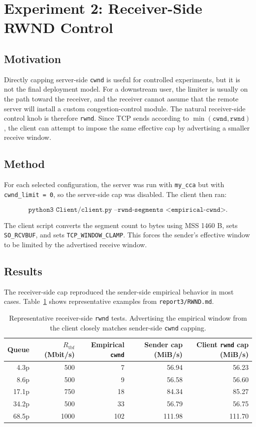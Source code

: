 \documentclass{article}
\newcommand{\code}[1]{\texttt{#1}}
\begin{document}
\section{Experiment 2: Receiver-Side RWND Control}

\subsection{Motivation}

Directly capping server-side \code{cwnd} is useful for controlled experiments, but it is not the final deployment model. 
For a downstream user, the limiter is usually on the path toward the receiver, and the receiver cannot assume that the 
remote server will install a custom congestion-control module. The natural receiver-side control knob is therefore 
\code{rwnd}. Since TCP sends according to \(\min(\code{cwnd}, \code{rwnd})\), the client can attempt to impose the same 
effective cap by advertising a smaller receive window.

\subsection{Method}

For each selected configuration, the server was run with \code{my\_cca} but with \code{cwnd\_limit = 0}, so the 
server-side cap was disabled. The client then ran:

\[
\code{python3 Client/client.py --rwnd-segments <empirical-cwnd>}.
\]

The client script converts the segment count to bytes using MSS 1460 B, sets \code{SO\_RCVBUF}, and sets 
\code{TCP\_WINDOW\_CLAMP}. This forces the sender's effective window to be limited by the advertised receive window.

\subsection{Results}

The receiver-side cap reproduced the sender-side empirical behavior in most cases. Table~\ref{tab:rwnd_examples} 
shows representative examples from \code{report3/RWND.md}.

\begin{table}[H]
  \centering
  \begin{tabular}{rrrrr}
    \toprule
    Queue & \(R_{\mathrm{tbf}}\) (Mbit/s) & Empirical \code{cwnd} & Sender cap (MiB/s) & Client \code{rwnd} cap (MiB/s) \\
    \midrule
    4.3p & 500 & 7 & 56.94 & 56.23 \\
    8.6p & 500 & 9 & 56.58 & 56.60 \\
    17.1p & 750 & 18 & 84.34 & 85.27 \\
    34.2p & 500 & 33 & 56.79 & 56.75 \\
    68.5p & 1000 & 102 & 111.98 & 111.70 \\
    \bottomrule
  \end{tabular}
  \caption{Representative receiver-side \code{rwnd} tests. Advertising the empirical window from the client closely matches sender-side \code{cwnd} capping.}
  \label{tab:rwnd_examples}
\end{table}
\end{document}
